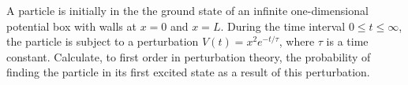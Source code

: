 \newcommand{\Vt}{V(t)}
\newcommand{\psiE}{\psi_E}
\newcommand{\qp}{^{(1)}}
\newcommand{\cnq}{c_n\qp}
\newcommand{\cnqt}{\cnq(t)}
\newcommand{\too}{t_0}
\newcommand{\inttot}{\int_{\too}^t}
\newcommand{\omg}{\omega}
\newcommand{\omgni}{\omg_{n i}}
\newcommand{\dtp}{\dd{t'}}
\newcommand{\Ho}{H_0}
\newcommand{\psiq}{\psi_1}
\newcommand{\psiw}{\psi_2}
\newcommand{\psiqt}{\psiq(t)}
\newcommand{\psiwt}{\psiw(t)}
\newcommand{\Eq}{E_1}
\newcommand{\Ew}{E_2}
\newcommand{\dxp}{\dd{x'}}
\newcommand{\dxpp}{\dd{x''}}
\newcommand{\intoi}{\int_0^\infty}
\newcommand{\intoL}{\int_0^L}
\newcommand{\intopi}{\int_0^\pi}
\newcommand{\intoepi}{\int_0^{3\pi}}
\newcommand{\du}{\dd{u}}
\newcommand{\ddv}{\dd{v}}


\begin{statement}{}
	A particle is initially in the the ground state of an infinite one-dimensional potential box with walls at $x = 0$ and $x = L$.  During the time interval $0 \leq t \leq \infty$, the particle is subject to a perturbation $\Vt = x^2 e^{-t/\tau}$, where $\tau$ is a time constant.  Calculate, to first order in perturbation theory, the probability of finding the particle in its first excited state as a result of this perturbation.
\end{statement}

